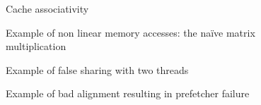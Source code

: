 \begin{figure}[htb]
    \centering
    \caption{Cache associativity}
    \label{fig:cache-assoc}
\end{figure}


\begin{figure}[htb]
    \centering
    
    \caption{Example of non linear memory accesses: the naïve matrix multiplication}
    \label{fig:mat-mult}
\end{figure}

\begin{figure}[htb]
    \centering
    \caption{Example of false sharing with two threads}
    \label{fig:false-sharing}
\end{figure}

\begin{figure}[htb]
    \centering
    \caption{Example of bad alignment resulting in prefetcher failure}
    \label{fig:bad-align}
\end{figure}

